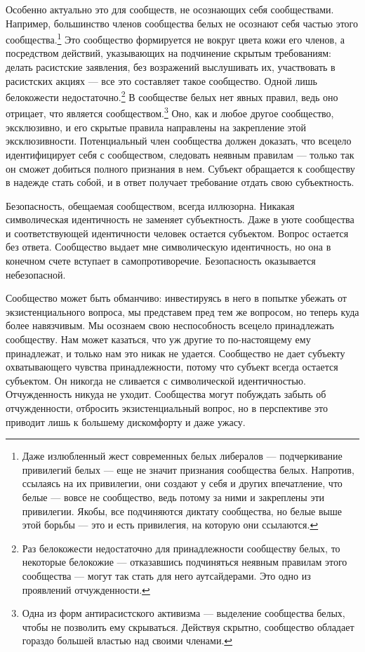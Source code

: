 \documentclass[12pt]{book}
\begin{document}
Особенно актуально это для сообществ, не осознающих себя сообществами. Например, большинство членов сообщества белых не осознают себя частью этого сообщества.\footnote{Даже излюбленный жест современных белых либералов --- подчеркивание привилегий белых --- еще не значит признания сообщества белых. Напротив, ссылаясь на их привилегии, они создают у себя и других впечатление, что белые --- вовсе не сообщество, ведь потому за ними и закреплены эти привилегии. Якобы, все подчиняются диктату сообщества, но белые выше этой борьбы --- это и есть привилегия, на которую они ссылаются.} Это сообщество формируется не вокруг цвета кожи его членов, а посредством действий, указывающих на подчинение скрытым требованиям: делать расистские заявления, без возражений выслушивать их, участвовать в расистских акциях --- все это составляет такое сообщество. Одной лишь белокожести недостаточно.\footnote{Раз белокожести недостаточно для принадлежности сообществу белых, то некоторые белокожие --- отказавшись подчиняться неявным правилам этого сообщества --- могут так стать для него аутсайдерами. Это одно из проявлений отчужденности.} В сообществе белых нет явных правил, ведь оно отрицает, что является сообществом.\footnote{Одна из форм антирасистского активизма --- выделение сообщества белых, чтобы не позволить ему скрываться. Действуя скрытно, сообщество обладает гораздо большей властью над своими членами.} Оно, как и любое другое сообщество, эксклюзивно, и его скрытые правила направлены на закрепление этой эксклюзивности. Потенциальный член сообщества должен доказать, что всецело идентифицирует себя с сообществом, следовать неявным правилам --- только так он сможет добиться полного признания в нем. Субъект обращается к сообществу в надежде стать собой, и в ответ получает требование отдать свою субъектность.

Безопасность, обещаемая сообществом, всегда иллюзорна. Никакая символическая идентичность не заменяет субъектность. Даже в уюте сообщества и соответствующей идентичности человек остается субъектом. Вопрос остается без ответа. Сообщество выдает мне символическую идентичность, но она в конечном счете вступает в самопротиворечие. Безопасность оказывается небезопасной.

Сообщество может быть обманчиво: инвестируясь в него в попытке убежать от экзистенциального вопроса, мы представем пред тем же вопросом, но теперь куда более навязчивым. Мы осознаем свою неспособность всецело принадлежать сообществу. Нам может казаться, что уж другие то по-настоящему ему принадлежат, и только нам это никак не удается. Сообщество не дает субъекту охватывающего чувства принадлежности, потому что субъект всегда остается субъектом. Он никогда не сливается с символической идентичностью. Отчужденность никуда не уходит. Сообщества могут побуждать забыть об отчужденности, отбросить экзистенциальный вопрос, но в перспективе это приводит лишь к большему дискомфорту и даже ужасу.
\end{document}
